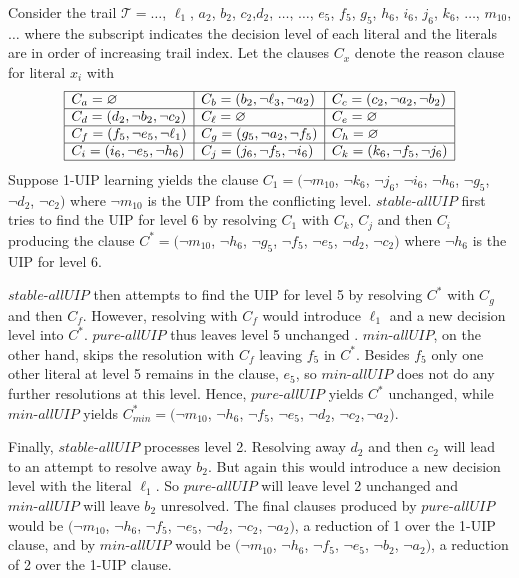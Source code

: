 \documentclass[runningheads]{llncs}
\newcommand{\assertionTrail}{\trail}
\newcommand{\allUip}{\textit{stable-allUIP}}
\newcommand{\allUipPure}{\textit{pure-allUIP}\xspace}
\newcommand{\allUipMin}{\textit{min-allUIP}\xspace}
\newcommand{\trail}{\ensuremath{\mathcal{T}}}
\newcommand{\whitebox}{\raisebox{.5ex}{\fbox{\hspace*{.2ex}}}}
\begin{document}
\begin{example}
    Consider the trail $\assertionTrail = \ldots$, $\ell_1$, $a_2$, $b_2$,
    $c_2$,$d_2$, $\ldots$, $\ldots$, $e_5$, $f_5$, $g_5$,
    $h_6$, $i_6$, $j_6$, $k_6$, $\ldots$, $m_{10}$,
    $\ldots$ where the subscript indicates the decision level of each
    literal and the literals are in order of increasing trail
    index. Let the clauses
    $C_x$ denote the reason clause for literal $x_i$ with 
    \[\begin{array}{|l|l|l|}\hline
      C_{a} = \varnothing 
      & C_{b} =  (b_2, \lnot \ell_3, \lnot a_2)
      & C_{c} =  (c_2, \lnot a_2, \lnot b_2) \\\hline
      C_{d} =  (d_2, \lnot b_2, \lnot c_2) 
      & C_{\ell} =\varnothing
      & C_{e} =\varnothing \\\hline
      C_{f} =  (f_5, \lnot e_5,\lnot \ell_1)
      & C_{g} = (g_5, \lnot a_2, \lnot f_5)
      & C_{h} =\varnothing \\\hline
      C_{i} =  (i_6, \lnot e_5, \lnot h_6)
      & C_{j} = (j_6, \lnot f_5, \lnot i_6 )
      & C_{k} = (k_6, \lnot f_5, \lnot j_6) \\\hline
      \end{array}
  \]
  Suppose 1-UIP learning yields the clause
  $C_1 = (\neg{m_{10}}$, $\neg{k_6}$, $\neg{j_6}$, $\neg{i_6}$,
  $\neg{h_6}$, $\neg{g_5}$, $\neg{d_2}$, $\neg{c_2})$ where $\neg{m_{10}}$
  is the UIP from the conflicting level. $\allUip$ first tries to find
  the UIP for level 6 by resolving $C_1$ with $C_k$, $C_j$
  and then $C_i$ producing the clause
  $C^* = (\neg{m_{10}}$, $\neg{h_6}$, $\neg{g_5}$,
  $\neg{f_5}$, $\neg{e_5}$, $\neg{d_2}$, $\neg{c_2})$ where
  $\neg{h_6}$ is the UIP for level 6.

  $\allUip$ then attempts to find the UIP for level 5 by resolving $C^*$
  with $C_g$ and then $C_f$. However, resolving with $C_f$ would
  introduce $\ell_1$ and a new decision level into $C^*$. $\allUipPure$
  thus leaves level 5 unchanged . $\allUipMin$, on the other hand, skips
  the resolution with $C_f$  leaving $f_5$ in $C^*$. Besides $f_5$
  only one other literal at level 5 remains in the clause, $e_5$,
  so $\allUipMin$ does not do any further resolutions at this level. Hence,
  $\allUipPure$ yields $C^*$ unchanged, while $\allUipMin$ yields
  $C^*_{\mathit{min}} = (\neg{m_{10}}$, $\neg{h_6}$, $\neg{f_5}$,
  $\neg{e_5}$, $\neg{d_2}$, $\neg{c_2}, \lnot a_2)$.

  Finally, $\allUip$ processes level 2. Resolving away $d_2$ and then
  $c_2$ will lead to an attempt to resolve away $b_2$. But again this
  would introduce a new decision level with the literal $\ell_1$. So
  $\allUipPure$ will leave level 2 unchanged and $\allUipMin$ will leave
  $b_2$ unresolved. The final clauses produced by $\allUipPure$ would be
  $(\neg{m_{10}}$, $\neg{h_6}$, $\neg{f_5}$, $\neg{e_5}$, $\neg{d_2}$,
  $\neg{c_2}$, $\neg{a_2})$, a reduction of 1 over the 1-UIP clause,
  and by $\allUipMin$ would be $(\neg{m_{10}}$, $\neg{h_6}$,
  $\neg{f_5}$, $\neg{e_5}$, $\neg{b_2}$, $\neg{a_2})$, a reduction of
  2 over the 1-UIP clause.
\whitebox
\end{example}
\end{document}
